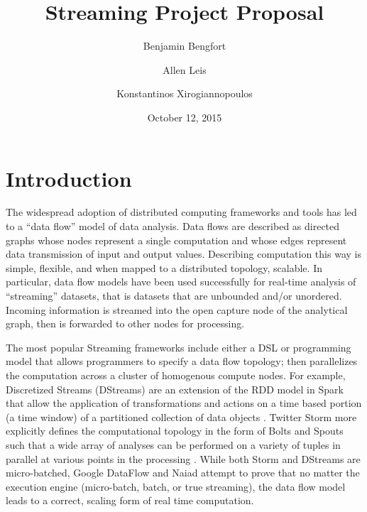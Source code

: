 \documentclass[11pt,letterpaper]{article}
\begin{document}
\title{Streaming Project Proposal}
\author[1]{Benjamin Bengfort}
\author[2]{Allen Leis}
\author[1]{Konstantinos Xirogiannopoulos}

\date{October 12, 2015}

\maketitle
\section*{Introduction}

The widespread adoption of distributed computing frameworks and tools has led to a ``data flow'' model of data analysis. Data flows are described as directed graphs whose nodes represent a single computation and whose edges represent data transmission of input and output values. Describing computation this way is simple, flexible, and when mapped to a distributed topology, scalable. In particular, data flow models have been used successfully for real-time analysis of ``streaming'' datasets, that is datasets that are unbounded and/or unordered. Incoming information is streamed into the open capture node of the analytical graph, then is forwarded to other nodes for processing.

The most popular Streaming frameworks include either a DSL or programming model that allows programmers to specify a data flow topology; then parallelizes the computation across a cluster of homogenous compute nodes. For example, Discretized Streams (DStreams) are an extension of the RDD model in Spark that allow the application of transformations and actions on a time based portion (a time window) of a partitioned collection of data objects \cite{zaharia2012discretized}. Twitter Storm more explicitly defines the computational topology in the form of Bolts and Spouts such that a wide array of analyses can be performed on a variety of tuples in parallel at various points in the processing \cite{toshniwal2014storm}. While both Storm and DStreams are micro-batched, Google DataFlow \cite{akidau2015dataflow} and Naiad \cite{murray2013naiad} attempt to prove that no matter the execution engine (micro-batch, batch, or true streaming), the data flow model leads to a correct, scaling form of real time computation.
\end{document}

